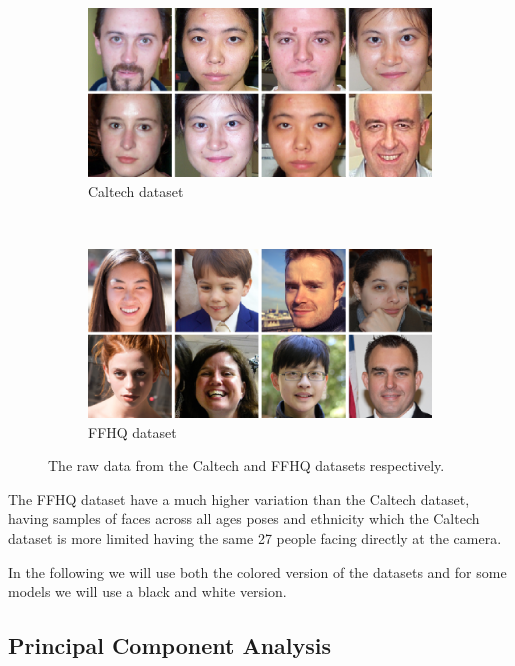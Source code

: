 \begin{figure}[h!]
    \centering
    \begin{subfigure}[b]{0.45\textwidth}
        \includegraphics[width=\textwidth]{fig/data/caltech}
        \caption{Caltech dataset}
        \label{raw-caltech}
    \end{subfigure}
    ~
    \begin{subfigure}[b]{0.45\textwidth}
        \includegraphics[width=\textwidth]{fig/data/ffhq}
        \caption{FFHQ dataset}
        \label{raw-ffhq}
    \end{subfigure}

    \caption{The raw data from the Caltech and FFHQ datasets respectively.}
    \label{rawdata}
\end{figure}

The FFHQ dataset have a much higher variation than the Caltech dataset, having samples of faces across all ages poses and ethnicity which the Caltech dataset is more limited having the same 27 people facing directly at the camera. 

In the following we will use both the colored version of the datasets and for some models we will use a black and white version. 

\subsection{Principal Component Analysis}

